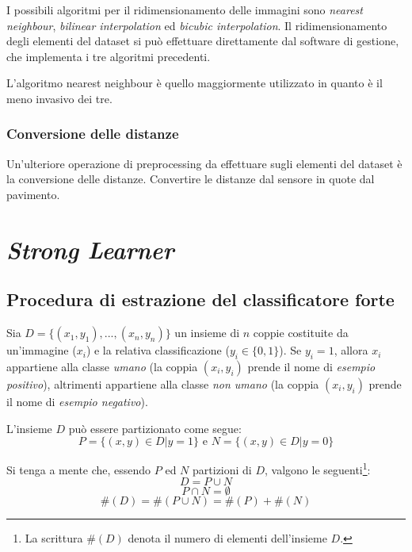                 I possibili algoritmi per il ridimensionamento delle immagini sono \emph{nearest neighbour}, \emph{bilinear interpolation} ed \emph{bicubic interpolation}.
                Il ridimensionamento degli elementi del dataset si può effettuare direttamente dal software di gestione, che implementa i tre algoritmi precedenti.

                L'algoritmo nearest neighbour è quello maggiormente utilizzato in quanto è il meno invasivo dei tre.

            \subsubsection{Conversione delle distanze}
                Un'ulteriore operazione di preprocessing da effettuare sugli elementi del dataset è la conversione delle distanze.
                Convertire le distanze dal sensore in quote dal pavimento.

    \section{\emph{Strong Learner}}
    \label{sec:strong_learner}
        \subsection{Procedura di estrazione del classificatore forte}
            Sia $D = \{(x_1, y_1), ..., (x_n, y_n)\}$ un insieme di $n$ coppie costituite da un'immagine ($x_i$) e la relativa classificazione ($y_i \in \{ 0, 1 \}$). Se $y_i = 1$, allora $x_i$ appartiene alla classe \emph{umano} (la coppia $(x_i, y_i)$ prende il nome di \emph{esempio positivo}), altrimenti appartiene alla classe \emph{non umano} (la coppia $(x_i, y_i)$ prende il nome di \emph{esempio negativo}).

            L'insieme $D$ può essere partizionato come segue:
            $$P = \{(x, y) \in D | y = 1\} \text{ e } N = \{(x,y) \in D | y = 0\}$$

            Si tenga a mente che, essendo $P$ ed $N$ partizioni di $D$, valgono le seguenti\footnote{La scrittura $\#(D)$ denota il numero di elementi dell'insieme $D$.}:
            \begin{equation}
                D = P \cup N
            \end{equation}
            \begin{equation}
                P \cap N = \emptyset
            \end{equation}
            \begin{equation}
                \#(D) = \#(P \cup N) = \#(P) + \#(N)
            \end{equation}

